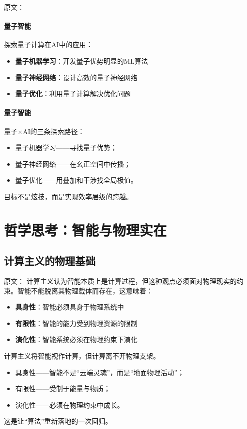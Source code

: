 原文：
\paragraph{量子智能}
探索量子计算在AI中的应用：
\begin{itemize}
\item \textbf{量子机器学习}：开发量子优势明显的ML算法
\item \textbf{量子神经网络}：设计高效的量子神经网络
\item \textbf{量子优化}：利用量子计算解决优化问题
\end{itemize}
\paragraph{量子智能}
量子×AI的三条探索路径：
\begin{itemize}
\item 量子机器学习——寻找量子优势；
\item 量子神经网络——在幺正空间中传播；
\item 量子优化——用叠加和干涉找全局极值。
\end{itemize}
目标不是炫技，而是实现效率层级的跨越。

\section{哲学思考：智能与物理实在}

\subsection{计算主义的物理基础}

原文：
计算主义认为智能本质上是计算过程，但这种观点必须面对物理现实的约束。智能不能脱离其物理载体而存在，这意味着：
\begin{itemize}
\item \textbf{具身性}：智能必须具身于物理系统中
\item \textbf{有限性}：智能的能力受到物理资源的限制
\item \textbf{演化性}：智能系统必须在物理约束下演化
\end{itemize}
计算主义将智能视作计算，但计算离不开物理支架。  
\begin{itemize}
\item 具身性——智能不是“云端灵魂”，而是“地面物理活动”；
\item 有限性——受制于能量与物质；
\item 演化性——必须在物理约束中成长。
\end{itemize}
这是让“算法”重新落地的一次回归。

